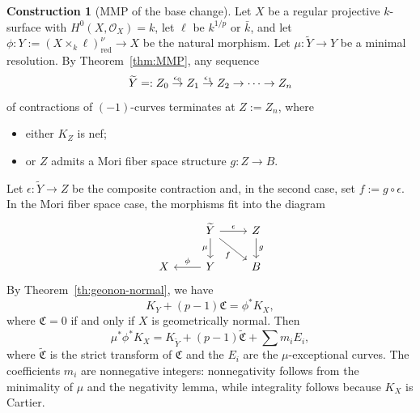 \documentclass[10pt,abstract=true]{scrartcl}
\numberwithin{equation}{section}
\theoremstyle{definition}
\newtheorem{construction}[theorem]{Construction}
\theoremstyle{remark}
\begin{document}
\begin{construction}[MMP of the base change]\label{cons:MMP}
Let $X$ be a regular projective $k$-surface with $H^0(X,\mathcal O_X)=k$, let $\ell$ be $k^{1/p}$ or $\bar k$, and let $\phi\colon Y:=(X\times_k\ell)_{\mathrm{red}}^\nu\to X$ be the natural morphism.
Let $\mu\colon \widetilde Y\to Y$ be a minimal resolution.
By Theorem~\ref{thm:MMP}, any sequence
\[
    \widetilde Y=:Z_0 \buildrel\epsilon_0\over\to Z_1 \buildrel\epsilon_1\over\to Z_2 \to\cdots\to Z_n
\]
of contractions of $(-1)$-curves terminates at $Z:=Z_n$, where
\begin{itemize}
  \item either $K_Z$ is nef; 
  \item or $Z$ admits a Mori fiber space structure $g\colon Z\to B$.
\end{itemize}
Let $\epsilon\colon\widetilde Y\to Z$ be the composite contraction and, in the second case, set $f:=g\circ\epsilon$.
In the Mori fiber space case, the morphisms fit into the diagram
\begin{equation}\label{eq:MMP-diagram-prelim}
  \begin{tikzcd}
    & \widetilde Y \ar[d,"\mu"'] \ar[r,"\epsilon"]
      \ar[dr,"f"'] & Z \ar[d,"g"] \\
    X & Y \ar[l,"\phi"'] & B
  \end{tikzcd}
\end{equation}
By Theorem~\ref{th:geonon-normal}, we have
\[
  K_Y+(p-1)\mathfrak C=\phi^*K_X,
\]
where $\mathfrak C=0$ if and only if $X$ is geometrically normal.
Then
\begin{equation}\label{eq:JJXM}
  \mu^*\phi^*K_X=K_{\widetilde Y}+(p-1)\widetilde{\mathfrak C}+\sum m_iE_i,
\end{equation}
where $\widetilde{\mathfrak C}$ is the strict transform of $\mathfrak C$ and the $E_i$ are the $\mu$-exceptional curves.
The coefficients $m_i$ are nonnegative integers: nonnegativity follows from the minimality of $\mu$ and the negativity lemma, while integrality follows because $K_X$ is Cartier.
\end{construction}
 
\end{document}
